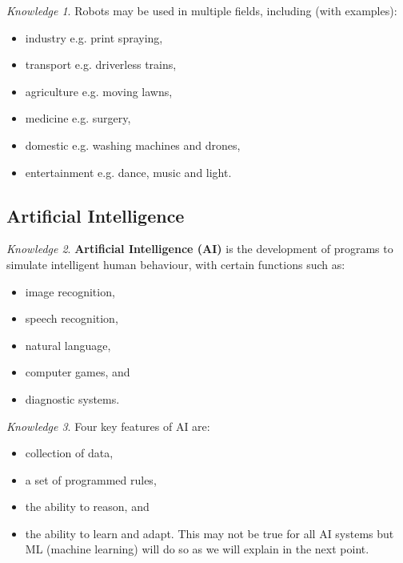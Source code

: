 \documentclass[8pt]{article}
\theoremstyle{remark}
\newtheorem{knowledge}{Knowledge}[subsection]
\begin{document}
            \begin{knowledge}
                Robots may be used in multiple fields, including (with examples):
                \begin{itemize}
                    \item industry e.g. print spraying,
                    \item transport e.g. driverless trains,
                    \item agriculture e.g. moving lawns,
                    \item medicine e.g. surgery,
                    \item domestic e.g. washing machines and drones,
                    \item entertainment e.g. dance, music and light.
                \end{itemize}
            \end{knowledge}
        \subsection{Artificial Intelligence}

            \begin{knowledge}
                \textbf{Artificial Intelligence (AI)} is the development of programs to simulate intelligent human behaviour, with certain functions such as:
                \begin{itemize}
                    \item image recognition,
                    \item speech recognition,
                    \item natural language,
                    \item computer games, and
                    \item diagnostic systems.
                \end{itemize}
            \end{knowledge}

            \begin{knowledge}
                Four key features of AI are:
                \begin{itemize}
                    \item collection of data,
                    \item a set of programmed rules,
                    \item the ability to reason, and
                    \item the ability to learn and adapt. This may not be true for all AI systems but ML (machine learning) will do so as we will explain in the next point.
                \end{itemize}
            \end{knowledge}
\end{document}
